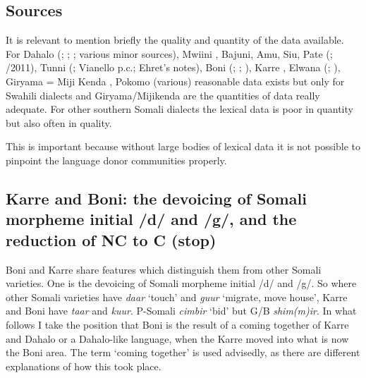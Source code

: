 \documentclass[output=paper
,newtxmath
,modfonts
,nonflat]{langsci/langscibook}
\begin{document}
\subsection{Sources}\label{sec:nurse:5.1} It is relevant to mention briefly the quality and quantity of the data available. For Dahalo (\citealt{Nurse1986}; \citealt{Ehret1989}; \citealt{Tosco1991}; various minor sources), Mwiini \citep{Kisseberth2004}, Bajuni, Amu, Siu, Pate (\citealt{Sacleux1939}; \citealt{Nurse2013}/2011), Tunni (\citealt{Tosco1997}; Vianello p.c.; Ehret's notes), Boni  (\citealt{Heine1977}; \citeyear{heine1982}; \citealt{sasse1979}), Karre \citep{Tosco1994}, Elwana (\citealt{nurse1994}; \citeyear{Nurse2000}), Giryama = Miji Kenda \citep{Deed1964}, Pokomo (various) reasonable data exists but only for Swahili dialects and Giryama/Mijikenda are the quantities of data really adequate. For other southern Somali dialects the lexical data is poor in quantity but also often in quality. 

  This is important because without large bodies of lexical data it is not possible to pinpoint the language donor communities properly.

\subsection{Karre and Boni: the devoicing of Somali morpheme initial /d/ and /g/, and the reduction of NC to C (stop)}\label{sec:nurse:5.2} Boni and Karre share features which distinguish them from other Somali varieties. One is the devoicing of Somali morpheme initial /d/ and /g/. So where other Somali varieties have \textit{daar} ‘touch’ and \textit{guur} ‘migrate, move house’, Karre and Boni have \textit{taar} and \textit{kuur}. P-Somali \textit{cimbir} ‘bid’ but G/B \textit{shim(m)ir}. In what follows I take the position that Boni is the result of a coming together of Karre and Dahalo or a Dahalo-like language, when the Karre moved into what is now the Boni area. The term ‘coming together’ is used advisedly, as there are different explanations of how this took place.  
\end{document}
